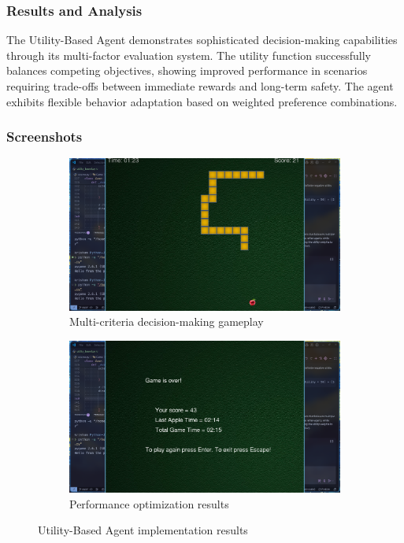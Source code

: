 \documentclass[11pt,a4paper]{article}
\begin{document}
\subsubsection{Results and Analysis}
The Utility-Based Agent demonstrates sophisticated decision-making capabilities through its multi-factor evaluation system. The utility function successfully balances competing objectives, showing improved performance in scenarios requiring trade-offs between immediate rewards and long-term safety. The agent exhibits flexible behavior adaptation based on weighted preference combinations.

\subsubsection{Screenshots}
\begin{figure}[H]
    \centering
    \begin{subfigure}{0.45\textwidth}
        \includegraphics[width=\textwidth]{ss/utility_based_play.png}
        \caption{Multi-criteria decision-making gameplay}
    \end{subfigure}
    \hfill
    \begin{subfigure}{0.45\textwidth}
        \includegraphics[width=\textwidth]{ss/utility_based_score.png}
        \caption{Performance optimization results}
    \end{subfigure}
    \caption{Utility-Based Agent implementation results}
\end{figure}
\end{document}
